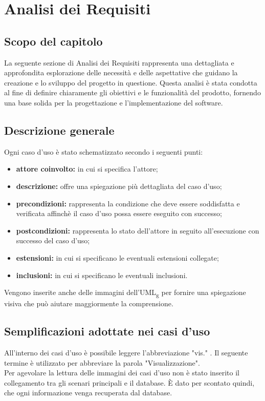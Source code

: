 \chapter{Analisi dei Requisiti}
\label{cap:analisi-requisiti}
\section{Scopo del capitolo}
La seguente sezione di Analisi dei Requisiti rappresenta una dettagliata e approfondita esplorazione delle necessità e delle aspettative che guidano la creazione e lo sviluppo del progetto in questione. Questa analisi è stata condotta al fine di definire chiaramente gli obiettivi e le funzionalità del prodotto, fornendo una base solida per la progettazione e l'implementazione del software.

\section{Descrizione generale}
Ogni caso d'uso è stato schematizzato secondo i seguenti punti:
\begin{itemize}
\item \textbf{attore coinvolto:} in cui si specifica l'attore;
\item \textbf{descrizione:} offre una spiegazione più dettagliata del caso d'uso; 
\item \textbf{precondizioni:} rappresenta la condizione che deve essere soddisfatta e verificata affinchè il caso d'uso possa essere eseguito con successo;
\item \textbf{postcondizioni:} rappresenta lo stato dell'attore in seguito all'esecuzione con successo del caso d'uso;
\item \textbf{estensioni:} in cui si specificano le eventuali estensioni collegate;
\item \textbf{inclusioni:} in cui si specificano le eventuali inclusioni.
\end{itemize}
Vengono inserite anche delle immagini dell'UML\textsubscript{g} per fornire una spiegazione visiva che può aiutare maggiormente la comprensione.

\section{Semplificazioni adottate nei casi d'uso}
All'interno dei casi d'uso è possibile leggere l'abbreviazione "vis." . Il seguente termine è utilizzato per abbreviare la parola "Visualizzazione".\\
Per agevolare la lettura delle immagini dei casi d'uso non è stato inserito il collegamento tra gli scenari principali e il database. È dato per scontato quindi, che ogni informazione venga recuperata dal database.\\

